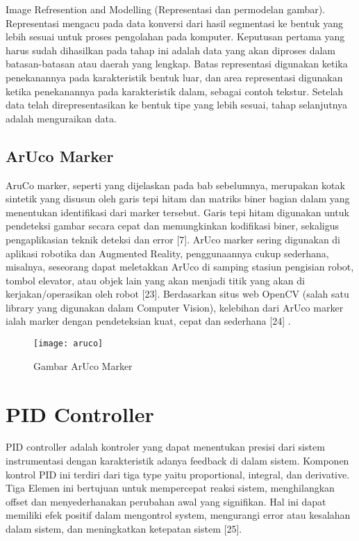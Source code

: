 \begin{packed_enum}
	\item Image Refresention and Modelling (Representasi dan permodelan gambar).
	\\	Representasi mengacu pada data konversi dari hasil segmentasi ke bentuk yang lebih sesuai untuk proses pengolahan pada komputer. Keputusan pertama yang harus sudah dihasilkan pada tahap ini adalah data yang akan diproses dalam batasan-batasan atau daerah yang lengkap. Batas representasi digunakan ketika penekanannya pada karakteristik bentuk luar, dan area representasi digunakan ketika penekanannya pada karakteristik dalam, sebagai contoh tekstur. Setelah data telah direpresentasikan ke bentuk tipe yang lebih sesuai, tahap selanjutnya adalah menguraikan data.
\end{packed_enum}

\subsection{ArUco Marker}
AruCo marker, seperti yang dijelaskan pada bab sebelumnya, merupakan kotak sintetik yang disusun oleh garis tepi hitam dan matriks biner bagian dalam yang menentukan identifikasi dari marker tersebut. Garis tepi hitam digunakan untuk pendeteksi gambar secara cepat dan memungkinkan kodifikasi biner, sekaligus pengaplikasian teknik deteksi dan error [7].
ArUco marker sering digunakan di aplikasi robotika dan Augmented Reality, penggunaannya cukup sederhana, misalnya, seseorang dapat meletakkan ArUco di samping stasiun pengisian robot, tombol elevator, atau objek lain yang akan menjadi titik yang akan di kerjakan/operasikan oleh robot [23]. Berdasarkan situs web OpenCV (salah satu library yang digunakan dalam Computer Vision), kelebihan dari ArUco marker ialah marker dengan pendeteksian kuat, cepat dan sederhana [24] .

\begin{figure}[H]
	\centering
	\texttt{[image: aruco]}
	\caption{Gambar ArUco Marker}
	\label{fig:aruco}
\end{figure}

\section{PID Controller}
PID controller adalah kontroler yang dapat menentukan presisi dari sistem instrumentasi dengan karakteristik adanya feedback di dalam sistem. Komponen kontrol PID ini terdiri dari tiga type yaitu proportional, integral, dan derivative. Tiga Elemen ini bertujuan untuk mempercepat reaksi sistem, menghilangkan offset dan menyederhanakan perubahan awal yang signifikan. Hal ini dapat memiliki efek positif dalam mengontrol system, mengurangi error atau kesalahan dalam sistem, dan meningkatkan ketepatan sistem [25].

